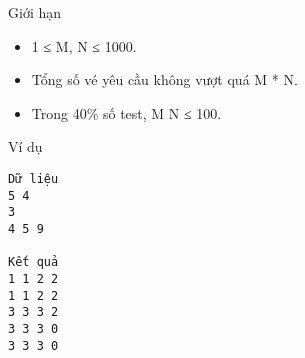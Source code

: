 Giới hạn  
\begin{itemize}
	\item     1 ≤ M, N ≤ 1000.   
	\item     Tổng số vé yêu cầu không vượt quá M * N.   
	\item     Trong 40\% số test, M N ≤ 100.   
\end{itemize}
   Ví dụ  
\begin{verbatim}
Dữ liệu
5 4
3
4 5 9

Kết quả
1 1 2 2
1 1 2 2
3 3 3 2
3 3 3 0
3 3 3 0
\end{verbatim}